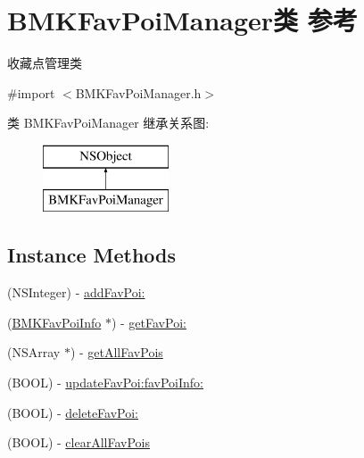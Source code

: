 \hypertarget{interface_b_m_k_fav_poi_manager}{}\section{B\+M\+K\+Fav\+Poi\+Manager类 参考}
\label{interface_b_m_k_fav_poi_manager}


收藏点管理类  




{\ttfamily \#import $<$B\+M\+K\+Fav\+Poi\+Manager.\+h$>$}

类 B\+M\+K\+Fav\+Poi\+Manager 继承关系图\+:\begin{figure}[H]
\begin{center}
\leavevmode
\includegraphics[height=2.000000cm]{interface_b_m_k_fav_poi_manager}
\end{center}
\end{figure}
\subsection*{Instance Methods}
\begin{DoxyCompactItemize}
\item 
(N\+S\+Integer) -\/ \hyperlink{interface_b_m_k_fav_poi_manager_ad34be09541e56b63341787f240c28dca}{add\+Fav\+Poi\+:}
\item 
(\hyperlink{interface_b_m_k_fav_poi_info}{B\+M\+K\+Fav\+Poi\+Info} $\ast$) -\/ \hyperlink{interface_b_m_k_fav_poi_manager_af64f90fa939d55cfcbc261f49983ec75}{get\+Fav\+Poi\+:}
\item 
(N\+S\+Array $\ast$) -\/ \hyperlink{interface_b_m_k_fav_poi_manager_ab27a17d393ca415bd85d6781ecabf98a}{get\+All\+Fav\+Pois}
\item 
(B\+O\+O\+L) -\/ \hyperlink{interface_b_m_k_fav_poi_manager_af1f647c345a7efa8aff8af009683b57b}{update\+Fav\+Poi\+:fav\+Poi\+Info\+:}
\item 
(B\+O\+O\+L) -\/ \hyperlink{interface_b_m_k_fav_poi_manager_ac3ab3cb3912e4d1e08a971d4d1a23d7b}{delete\+Fav\+Poi\+:}
\item 
(B\+O\+O\+L) -\/ \hyperlink{interface_b_m_k_fav_poi_manager_a1560ebc6ff98da5a48ea14bd2eea3f0e}{clear\+All\+Fav\+Pois}
\end{DoxyCompactItemize}


